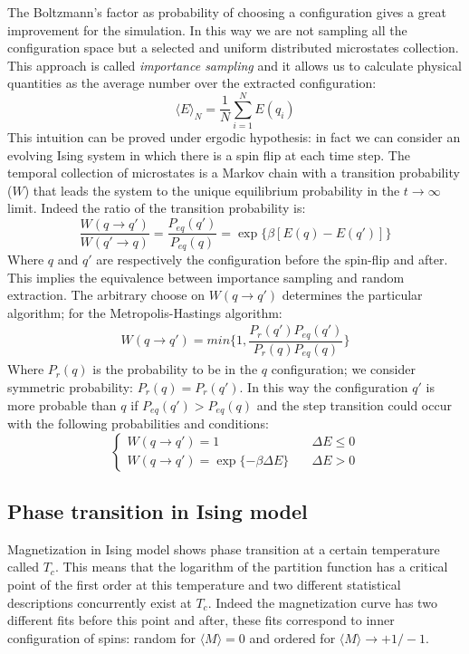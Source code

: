 \documentclass[11pt,a4paper]{article}
\begin{document}
\newpage
The Boltzmann's factor as probability of choosing a configuration gives a great improvement for the simulation. In this way we are not sampling all the configuration space but a selected and uniform distributed microstates collection. This approach is called \textit{importance sampling} and it allows us to calculate physical quantities as the average number over the extracted configuration:
$$
  \langle E \rangle_N = \dfrac{1}{N} \sum_{i=1}^{N}{E(q_i)}
$$
This intuition can be proved under ergodic hypothesis: in fact we can consider an evolving Ising system in which there is a spin flip at each time step. The temporal collection of microstates is a Markov chain with a transition probability ($W$) that leads the system to the unique equilibrium probability in the $t \rightarrow \infty$ limit. Indeed the ratio of the transition probability is:
\begin{equation}
\dfrac{W(q \rightarrow q')}{W(q' \rightarrow q)} = \dfrac{P_{eq}(q')}{P_{eq}(q)}= \exp \lbrace \beta [E(q) - E(q')] \rbrace 
\end{equation}
Where $q$ and $q'$ are respectively the configuration before the spin-flip and after. This implies the equivalence between importance sampling and random extraction. The arbitrary choose on $W(q \rightarrow q')$ determines the particular algorithm; for the Metropolis-Hastings algorithm:
\begin{eqnarray}
W(q \rightarrow q') = min \bigg \lbrace 1 , \dfrac{P_r(q')P_{eq}(q')}{P_r(q)P_{eq}(q)} \bigg \rbrace
\end{eqnarray}
Where $P_r(q)$ is the probability to be in the $q$ configuration; we consider symmetric probability: $P_r(q)=P_r(q')$. In this way the configuration $q'$ is more probable than $q$ if $P_{eq}(q')>P_{eq}(q)$ and the step transition could occur with the following probabilities and conditions: 
\[
\begin{cases}
  W(q \rightarrow q')=1 &\quad \Delta E \leq 0 \\
  W(q \rightarrow q')=\exp \lbrace -\beta  \Delta E  \rbrace  &\quad \Delta E > 0
\end{cases}
\]
\bigskip

\subsection*{Phase transition in Ising model}
Magnetization in Ising model shows phase transition at a certain temperature called $T_c$. This means that the logarithm of the partition function has a critical point of the first order at this temperature and two different statistical descriptions concurrently exist at $T_c$. Indeed the magnetization curve has two different fits before this point and after, these fits correspond to inner configuration of spins: random for $\langle M \rangle = 0$ and ordered for $\langle M \rangle \rightarrow +1 / -1$.
\end{document}

